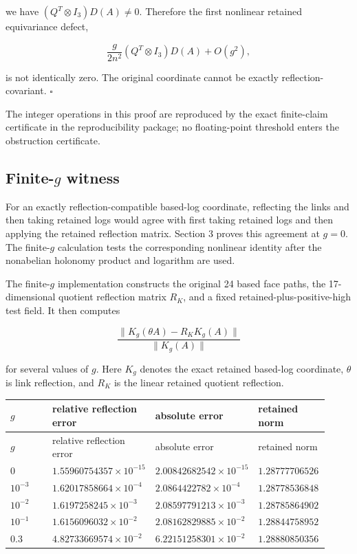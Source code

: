 \documentclass[10pt]{article}
\begin{document}
we have \((Q^T\otimes I_3)D(A)\ne0\).  Therefore the first nonlinear retained equivariance defect,

\[
\frac{g}{2n^2}(Q^T\otimes I_3)D(A)+O(g^2),
\]

is not identically zero.  The original coordinate cannot be exactly reflection-covariant.  \(\square\)

The integer operations in this proof are reproduced by the exact finite-claim certificate in the reproducibility package; no floating-point threshold enters the obstruction certificate.

\subsection{Finite-\(g\) witness}

For an exactly reflection-compatible based-log coordinate, reflecting the links and then taking retained logs would agree with first taking retained logs and then applying the retained reflection matrix.  Section 3 proves this agreement at \(g=0\).  The finite-\(g\) calculation tests the corresponding nonlinear identity after the nonabelian holonomy product and logarithm are used.

The finite-\(g\) implementation constructs the original 24 based face paths, the 17-dimensional quotient reflection matrix \(R_K\), and a fixed retained-plus-positive-high test field.  It then computes

\[
\frac{\|K_g(\theta A)-R_KK_g(A)\|}{\|K_g(A)\|}
\]

for several values of \(g\).  Here \(K_g\) denotes the exact retained based-log coordinate, \(\theta\) is link reflection, and \(R_K\) is the linear retained quotient reflection.

\begin{center}
\small
\begin{longtable}{|p{0.23\linewidth}|p{0.23\linewidth}|p{0.23\linewidth}|p{0.23\linewidth}|}
\hline
\(g\) & relative reflection error & absolute error & retained norm \\
\hline
\endfirsthead
\hline
\(g\) & relative reflection error & absolute error & retained norm \\
\hline
\endhead
\(0\) & \(1.55960754357\times10^{-15}\) & \(2.00842682542\times10^{-15}\) & \(1.28777706526\) \\
\hline
\(10^{-3}\) & \(1.62017858664\times10^{-4}\) & \(2.0864422782\times10^{-4}\) & \(1.28778536848\) \\
\hline
\(10^{-2}\) & \(1.6197258245\times10^{-3}\) & \(2.08597791213\times10^{-3}\) & \(1.28785864902\) \\
\hline
\(10^{-1}\) & \(1.6156096032\times10^{-2}\) & \(2.08162829885\times10^{-2}\) & \(1.28844758952\) \\
\hline
\(0.3\) & \(4.82733669574\times10^{-2}\) & \(6.22151258301\times10^{-2}\) & \(1.28880850356\) \\
\hline
\end{longtable}
\end{center}
\end{document}
